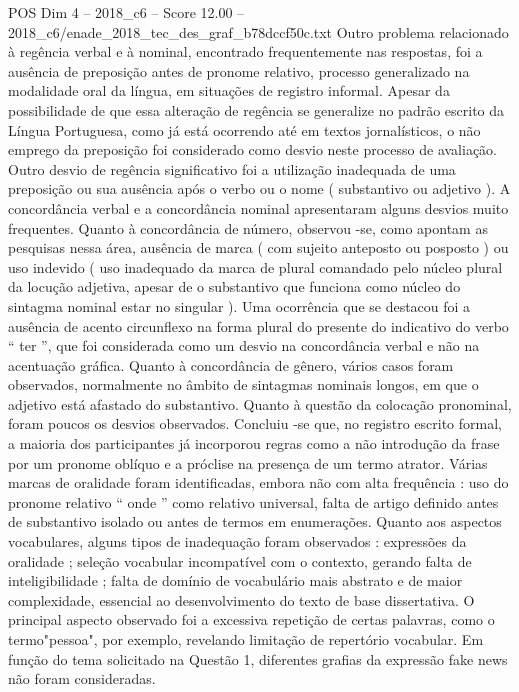 \begin{textsample}{POS Dim 4 – 2018\_c6 – Score 12.00 – 2018\_c6/enade\_2018\_tec\_des\_graf\_b78dccf50c.txt}
Outro problema relacionado à regência verbal e à nominal, encontrado frequentemente nas respostas, foi a ausência de preposição antes de pronome relativo, processo generalizado na modalidade oral da língua, em situações de registro informal.
Apesar da possibilidade de que essa alteração de regência se generalize no padrão escrito da Língua Portuguesa, como já está ocorrendo até em textos jornalísticos, o não emprego da preposição foi considerado como desvio neste processo de avaliação.
Outro desvio de regência significativo foi a utilização inadequada de uma preposição ou sua ausência após o verbo ou o nome ( substantivo ou adjetivo ).
A concordância verbal e a concordância nominal apresentaram alguns desvios muito frequentes.
Quanto à concordância de número, observou -se, como apontam as pesquisas nessa área, ausência de marca ( com sujeito anteposto ou posposto ) ou uso indevido ( uso inadequado da marca de plural comandado pelo núcleo plural da locução adjetiva, apesar de o substantivo que funciona como núcleo do sintagma nominal estar no singular ).
Uma ocorrência que se destacou foi a ausência de acento circunflexo na forma plural do presente do indicativo do verbo “ ter ”, que foi considerada como um desvio na concordância verbal e não na acentuação gráfica.
Quanto à concordância de gênero, vários casos foram observados, normalmente no âmbito de sintagmas nominais longos, em que o adjetivo está afastado do substantivo.
Quanto à questão da colocação pronominal, foram poucos os desvios observados.
Concluiu -se que, no registro escrito formal, a maioria dos participantes já incorporou regras como a não introdução da frase por um pronome oblíquo e a próclise na presença de um termo atrator.
Várias marcas de oralidade foram identificadas, embora não com alta frequência : uso do pronome relativo “ onde ” como relativo universal, falta de artigo definido antes de substantivo isolado ou antes de termos em enumerações.
Quanto aos aspectos vocabulares, alguns tipos de inadequação foram observados : expressões da oralidade ; seleção vocabular incompatível com o contexto, gerando falta de inteligibilidade ; falta de domínio de vocabulário mais abstrato e de maior complexidade, essencial ao desenvolvimento do texto de base dissertativa.
O principal aspecto observado foi a excessiva repetição de certas palavras, como o termo"pessoa", por exemplo, revelando limitação de repertório vocabular.
Em função do tema solicitado na Questão 1, diferentes grafias da expressão fake news não foram consideradas.

\end{textsample}
